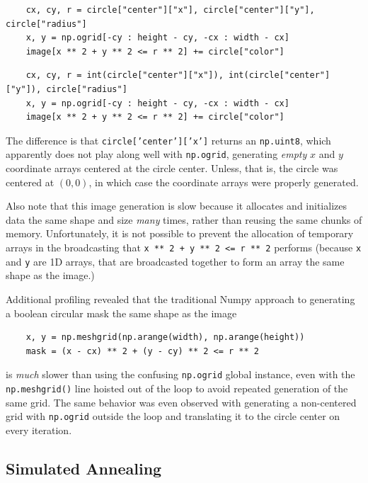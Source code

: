 \documentclass{article}
\begin{document}
\begin{verbatim}
    cx, cy, r = circle["center"]["x"], circle["center"]["y"], circle["radius"]
    x, y = np.ogrid[-cy : height - cy, -cx : width - cx]
    image[x ** 2 + y ** 2 <= r ** 2] += circle["color"]
\end{verbatim}

\begin{verbatim}
    cx, cy, r = int(circle["center"]["x"]), int(circle["center"]["y"]), circle["radius"]
    x, y = np.ogrid[-cy : height - cy, -cx : width - cx]
    image[x ** 2 + y ** 2 <= r ** 2] += circle["color"]
\end{verbatim}

The difference is that \texttt{circle['center']['x']} returns an \texttt{np.uint8}, which apparently does not play along well with \texttt{np.ogrid}, generating \textit{empty} $x$ and $y$ coordinate arrays centered at the circle center. Unless, that is, the circle was centered at $(0, 0)$, in which case the coordinate arrays were properly generated.

Also note that this image generation is slow because it allocates and initializes data the same shape and size \textit{many} times, rather than reusing the same chunks of memory. Unfortunately, it is not possible to prevent the allocation of temporary arrays in the broadcasting that \texttt{x ** 2 + y ** 2 <= r ** 2} performs (because \texttt{x} and \texttt{y} are 1D arrays, that are broadcasted together to form an array the same shape as the image.)

Additional profiling revealed that the traditional Numpy approach to generating a boolean circular mask the same shape as the image

\begin{verbatim}
    x, y = np.meshgrid(np.arange(width), np.arange(height))
    mask = (x - cx) ** 2 + (y - cy) ** 2 <= r ** 2
\end{verbatim}

is \textit{much} slower than using the confusing \texttt{np.ogrid} global instance, even with the \texttt{np.meshgrid()} line hoisted out of the loop to avoid repeated generation of the same grid. The same behavior was even observed with generating a non-centered grid with \texttt{np.ogrid} outside the loop and translating it to the circle center on every iteration.

\subsection{Simulated Annealing}\label{sec:strat:simulated-annealing}
\end{document}
